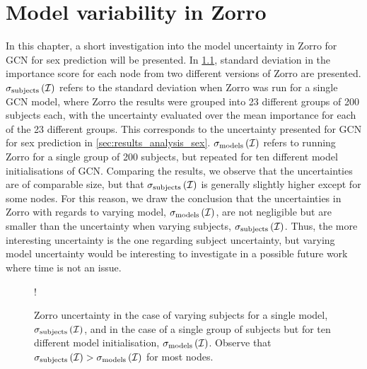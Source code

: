 \chapter{Model variability in Zorro}
\label{app:zorro_model_uncertainty}

In this chapter, a short investigation into the model uncertainty in Zorro for GCN for sex prediction will be presented. In \cref{fig:zorro_model_uncertainty}, standard deviation in the importance score for each node from two different versions of Zorro are presented. $\sigma_{\rm{subjects}}\left(\mathcal{I}\right)$ refers to the standard deviation when Zorro was run for a single GCN model, where Zorro the results were grouped into 23 different groups of 200 subjects each, with the uncertainty evaluated over the mean importance for each of the 23 different groups. This corresponds to the uncertainty presented for GCN for sex prediction in \cref{sec:results_analysis_sex}. $\sigma_{\rm{models}}\left(\mathcal{I}\right)$ refers to running Zorro for a single group of 200 subjects, but repeated for ten different model initialisations of GCN. Comparing the results, we observe that the uncertainties are of comparable size, but that $\sigma_{\rm{subjects}}\left(\mathcal{I}\right)$ is generally slightly higher except for some nodes. For this reason, we draw the conclusion that the uncertainties in Zorro with regards to varying model, $\sigma_{\rm{models}}\left(\mathcal{I}\right)$, are not negligible but are smaller than the uncertainty when varying subjects, $\sigma_{\rm{subjects}}\left(\mathcal{I}\right)$. Thus, the more interesting uncertainty is the one regarding subject uncertainty, but varying model uncertainty would be interesting to investigate in a possible future work where time is not an issue.

\begin{figure}[ht]
    \centering
    \begin{center}
        \resizebox {0.6\linewidth} {!} {
            
        }
    \end{center}
    \caption{Zorro uncertainty in the case of varying subjects for a single model, $\sigma_{\rm{subjects}}\left(\mathcal{I}\right)$, and in the case of a single group of subjects but for ten different model initialisation, $\sigma_{\rm{models}}\left(\mathcal{I}\right)$. Observe that $\sigma_{\rm{subjects}}\left(\mathcal{I}\right) > \sigma_{\rm{models}}\left(\mathcal{I}\right)$ for most nodes.}
    \label{fig:zorro_model_uncertainty}
\end{figure}